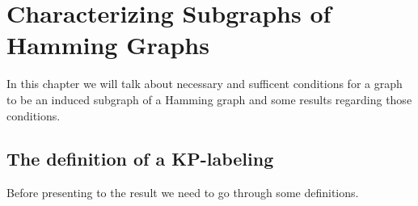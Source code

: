 \documentclass[12pt,a4paper,titlepage,openany]{report}
\begin{document}
\chapter{Characterizing Subgraphs of Hamming Graphs}\label{kp-chapter}
\thispagestyle{fancy}

In this chapter we will talk about necessary and sufficent conditions for a graph to be an induced subgraph of a Hamming graph and some results regarding those conditions.  

\section{The definition of a KP-labeling}\label{kp-labeling-section}

Before presenting to the result we need to go through some definitions.
\newline
\end{document}
